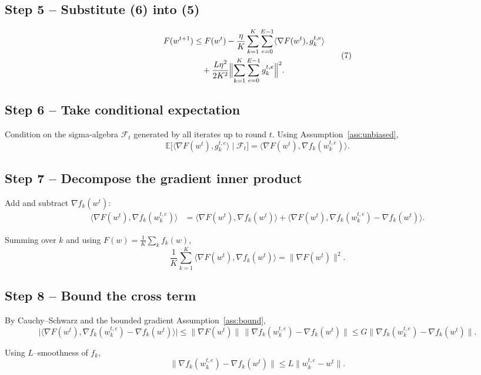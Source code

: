 \documentclass[11pt]{article}
\newcommand{\E}{\mathbb{E}}
\begin{document}
\subsection*{Step 5 – Substitute (6) into (5)}
\[
\begin{aligned}
F(w^{t+1}) &\le F(w^{t})
-\frac{\eta}{K}\sum_{k=1}^{K}\sum_{e=0}^{E-1}
\langle\nabla F(w^{t}),g_{k}^{t,e}\rangle \\
&\quad +\frac{L\eta^{2}}{2K^{2}}
\Bigl\|\sum_{k=1}^{K}\sum_{e=0}^{E-1} g_{k}^{t,e}\Bigr\|^{2}.
\end{aligned}
\tag{7}
\]

\subsection*{Step 6 – Take conditional expectation}
Condition on the sigma‑algebra $\mathcal{F}_{t}$ generated by all iterates up to round $t$.
Using Assumption~\ref{ass:unbiased},
\[
\E\!\bigl[\langle\nabla F(w^{t}),g_{k}^{t,e}\rangle\mid\mathcal{F}_{t}\bigr]
= \langle\nabla F(w^{t}),\nabla f_k(w_{k}^{t,e})\rangle .
\tag{8}
\]

\subsection*{Step 7 – Decompose the gradient inner product}
Add and subtract $\nabla f_k(w^{t})$:
\[
\begin{aligned}
\langle\nabla F(w^{t}),\nabla f_k(w_{k}^{t,e})\rangle
&=\langle\nabla F(w^{t}),\nabla f_k(w^{t})\rangle
   +\langle\nabla F(w^{t}),\nabla f_k(w_{k}^{t,e})-\nabla f_k(w^{t})\rangle .
\end{aligned}
\tag{9}
\]

Summing over $k$ and using $F(w)=\frac1K\sum_{k}f_k(w)$,
\[
\frac1K\sum_{k=1}^{K}\langle\nabla F(w^{t}),\nabla f_k(w^{t})\rangle
= \|\nabla F(w^{t})\|^{2}.
\tag{10}
\]

\subsection*{Step 8 – Bound the cross term}
By Cauchy–Schwarz and the bounded gradient Assumption~\ref{ass:bound},
\[
\bigl|\langle\nabla F(w^{t}),\nabla f_k(w_{k}^{t,e})-\nabla f_k(w^{t})\rangle\bigr|
\le \|\nabla F(w^{t})\|\,\|\nabla f_k(w_{k}^{t,e})-\nabla f_k(w^{t})\|
\le G\|\nabla f_k(w_{k}^{t,e})-\nabla f_k(w^{t})\|.
\tag{11}
\]

Using $L$–smoothness of $f_k$,
\[
\|\nabla f_k(w_{k}^{t,e})-\nabla f_k(w^{t})\|
\le L\|w_{k}^{t,e}-w^{t}\|.
\tag{12}
\]
\end{document}
